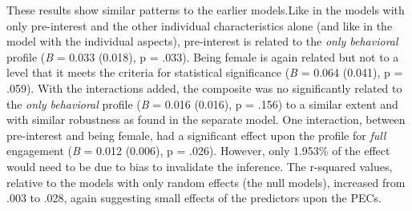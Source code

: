 \documentclass[]{book}
\theoremstyle{definition}
\theoremstyle{definition}
\theoremstyle{definition}
\theoremstyle{remark}
\begin{document}
These results show similar patterns to the earlier models.Like in the
models with only pre-interest and the other individual characteristics
alone (and like in the model with the individual aspects), pre-interest
is related to the \emph{only behavioral} profile (\emph{B} = 0.033
(0.018), p = .033). Being female is again related but not to a level
that it meets the criteria for statistical significance (\emph{B} =
0.064 (0.041), p = .059). With the interactions added, the composite was
no significantly related to the \emph{only behavioral} profile (\emph{B}
= 0.016 (0.016), p = .156) to a similar extent and with similar
robustness as found in the separate model. One interaction, between
pre-interest and being female, had a significant effect upon the profile
for \emph{full} engagement (\emph{B} = 0.012 (0.006), p = .026).
However, only 1.953\% of the effect would need to be due to bias to
invalidate the inference. The r-squared values, relative to the models
with only random effects (the null models), increased from .003 to .028,
again suggesting small effects of the predictors upon the PECs.
\end{document}
